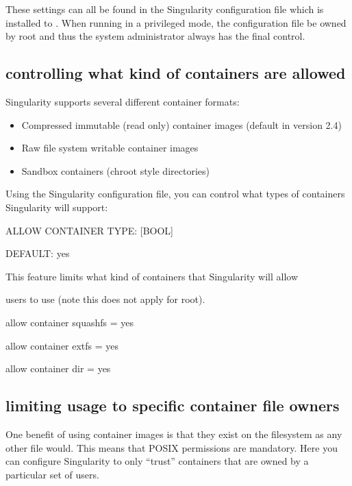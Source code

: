 \documentclass[letterpaper,10pt,english]{sphinxmanual}
\begin{document}
These settings can all be found in the Singularity configuration file
which is installed to . When running in a privileged mode, the
configuration file  be owned by root and thus the system
administrator always has the final control.


\subsection{controlling what kind of containers are allowed}
\label{\detokenize{security:controlling-what-kind-of-containers-are-allowed}}
Singularity supports several different container formats:
\begin{itemize}
\item {} 
 Compressed immutable (read only) container images
(default in version 2.4)

\item {} 
 Raw file system writable container images

\item {} 
 Sandbox containers (chroot style directories)

\end{itemize}

Using the Singularity configuration file, you can control what types of
containers Singularity will support:

%
\begin{sphinxVerbatim}[commandchars=\\\{\}]
\PYGZsh{} ALLOW CONTAINER \PYGZdl{}\PYGZob{}TYPE\PYGZcb{}: [BOOL]

\PYGZsh{} DEFAULT: yes

\PYGZsh{} This feature limits what kind of containers that Singularity will allow

\PYGZsh{} users to use (note this does not apply for root).

allow container squashfs = yes

allow container extfs = yes

allow container dir = yes
\end{sphinxVerbatim}


\subsection{limiting usage to specific container file owners}
\label{\detokenize{security:limiting-usage-to-specific-container-file-owners}}
One benefit of using container images is that they exist on the
filesystem as any other file would. This means that POSIX permissions
are mandatory. Here you can configure Singularity to only “trust”
containers that are owned by a particular set of users.
\end{document}
